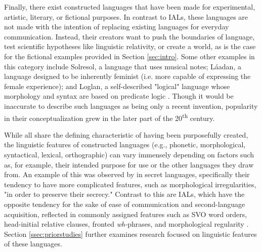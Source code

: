 \documentclass[12pt,a4paper]{article}
\numberwithin{figure}{section}
\numberwithin{table}{section}
\numberwithin{definition}{section}
\begin{document}



Finally, there exist constructed languages that have been made for experimental, artistic, literary, or fictional purposes. In contrast to IALs, these languages are not made with the intention of replacing existing languages for everyday communication. Instead, their creators want to push the boundaries of language, test scientific hypotheses like linguistic relativity, or create a world, as is the case for the fictional examples provided in Section \ref{sec:intro}. Some other examples in this category include Solresol, a language that uses musical notes; Láadan, a language designed to be inherently feminist (i.e. more capable of expressing the female experience); and Loglan, a self-described "logical" language whose morphology and syntax are based on predicate logic \parencite{Adelman2014article}. Though it would be inaccurate to describe such languages as being only a recent invention, popularity in their conceptualization grew in the later part of the 20\textsuperscript{th} century.

While all share the defining characteristic of having been purposefully created, the linguistic features of constructed languages (e.g., phonetic, morphological, syntactical, lexical, orthographic) can vary immensely depending on factors such as, for example, their intended purpose for use or the other languages they draw from. An example of this was observed by \textcite{Gobbo2016article} in secret languages, specifically their tendency to have more complicated features, such as morphological irregularities, "in order to preserve their secrecy." Contrast to this are IALs, which have the opposite tendency for the sake of ease of communication and second-language acquisition, reflected in commonly assigned features such as SVO word orders, head-initial relative clauses, fronted \textit{wh-}phrases, and morphological regularity \parencite{goodall2022article,Gobbo2016article}. Section \ref{ssec:priorstudies} further examines research focused on linguistic features of these languages. 
\end{document}
